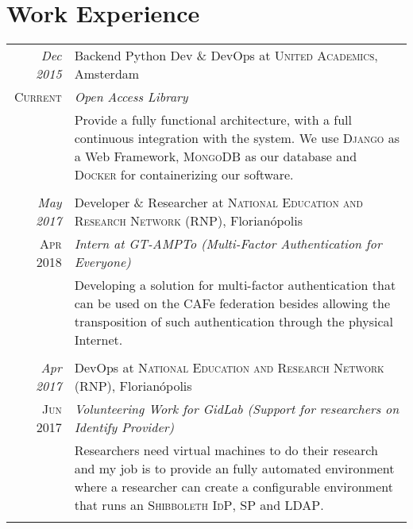 \documentclass[a4paper,10pt]{article}
\begin{document}
\section{Work Experience}
\begin{longtable}{r|p{11cm}}

\emph{Dec 2015} & Backend Python Dev \& DevOps at \textsc{United Academics}, Amsterdam \\\textsc{Current} & \emph{Open Access Library}\\&\footnotesize{Provide a fully functional architecture, with a full continuous integration with the system. We use \textsc{Django} as a Web Framework, \textsc{MongoDB} as our database and \textsc{Docker} for containerizing our software.}\\\multicolumn{2}{c}{} \\

\emph{May 2017} & Developer \& Researcher at \textsc{National Education and Research Network (RNP)}, Florianópolis \\\textsc{Apr 2018} & \emph{Intern at GT-AMPTo (Multi-Factor Authentication for Everyone)}\\&\footnotesize{Developing a solution for multi-factor authentication that can be used on the CAFe federation besides allowing the transposition of such authentication through the physical Internet.}\\\multicolumn{2}{c}{} \\


\emph{Apr 2017} & DevOps at \textsc{National Education and Research Network (RNP)}, Florianópolis \\\textsc{Jun 2017} & \emph{Volunteering Work for GidLab (Support for researchers on Identify Provider)}\\&\footnotesize{Researchers need virtual machines to do their research and my job is to provide an fully automated environment where a researcher can create a configurable environment that runs an \textsc{Shibboleth} \textsc{IdP}, \textsc{SP} and \textsc{LDAP}.}\\\multicolumn{2}{c}{} \\


\end{longtable}
\end{document}
